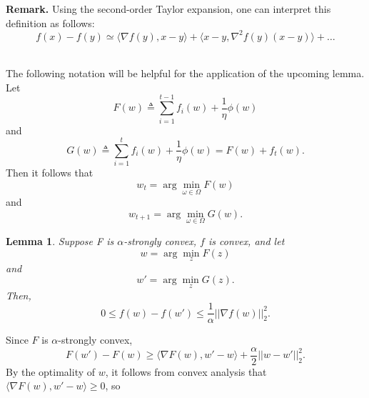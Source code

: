 \documentclass[11pt]{article}
\newtheorem{lemma}[theorem]{Lemma}
\begin{document}
\noindent\textbf{Remark.} Using the second-order Taylor expansion, one can interpret this definition  as follows:
\begin{equation*}
     f(x)- f(y) \simeq
    \langle \nabla f(y), x-y \rangle + 
    \langle x-y, \nabla^2 f(y)(x-y) \rangle + \ldots
\end{equation*}

~\\\noindent The following notation will be helpful for the application of the upcoming lemma. Let
$$F(w) \triangleq \sum_{i=1}^{t-1}f_i(w)+\frac{1}{\eta}\phi(w)$$
and 
$$G(w) \triangleq \sum_{i=1}^{t}f_i(w)+\frac{1}{\eta}\phi(w) = F(w) + f_t(w).$$
Then it follows that  
$$w_t = \arg \min_{\omega \in \Omega} F(w)$$
and 
$$w_{t+1} = \arg \min_{\omega \in \Omega} G(w).$$

\begin{lemma}\label{bound}
Suppose F is $\alpha$-strongly convex, $f$ is convex, and let 
$$w = \arg \min_z F(z)$$
and 
$$w' = \arg \min_z G(z).$$
Then, $$0 \leq f(w) - f(w') \leq \frac{1}{\alpha}||\nabla f(w)||_2^2.$$ 
\end{lemma}
\proof Since $F$ is $\alpha$-strongly convex, 
$$F(w')-F(w) \geq \langle \nabla F(w), w'-w \rangle + \frac{\alpha}{2}||w-w'||_2^2.$$
By the optimality of $w$, it follows from convex analysis that $\langle \nabla F(w),w'-w \rangle \geq 0$, so 
\end{document}
